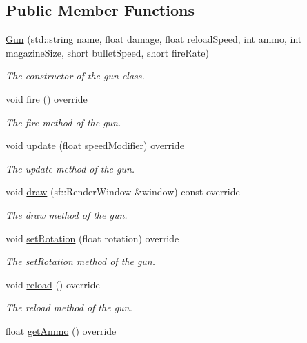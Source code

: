 \subsection*{Public Member Functions}
\begin{DoxyCompactItemize}
\item 
\hyperlink{class_gun_acb2c3c6a44842e8eeeb6eabde944235d}{Gun} (std\+::string name, float damage, float reload\+Speed, int ammo, int magazine\+Size, short bullet\+Speed, short fire\+Rate)
\begin{DoxyCompactList}\small\item\em The constructor of the gun class. \end{DoxyCompactList}\item 
void \hyperlink{class_gun_a84fec52052e08f9d3d9546a873ea90e8}{fire} () override
\begin{DoxyCompactList}\small\item\em The fire method of the gun. \end{DoxyCompactList}\item 
void \hyperlink{class_gun_ae7cbc34b103c1e89b4536309582dafb5}{update} (float speed\+Modifier) override
\begin{DoxyCompactList}\small\item\em The update method of the gun. \end{DoxyCompactList}\item 
void \hyperlink{class_gun_a9f9c687cb43472691c14af52f508553a}{draw} (sf\+::\+Render\+Window \&window) const override
\begin{DoxyCompactList}\small\item\em The draw method of the gun. \end{DoxyCompactList}\item 
void \hyperlink{class_gun_a86d524a277e286ff34c5a57cc9c8c438}{set\+Rotation} (float rotation) override
\begin{DoxyCompactList}\small\item\em The set\+Rotation method of the gun. \end{DoxyCompactList}\item 
void \hyperlink{class_gun_ad92a9c0cc00e8e65bb4f7589c9e58113}{reload} () override
\begin{DoxyCompactList}\small\item\em The reload method of the gun. \end{DoxyCompactList}\item 
float \hyperlink{class_gun_a11bf618e3bf21f3be546c843c64b06f1}{get\+Ammo} () override

\end{DoxyCompactItemize}
